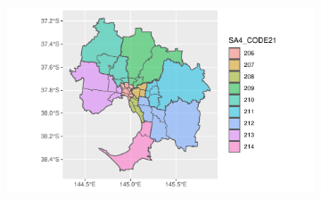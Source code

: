 \documentclass{monashthesis}
\begin{document}
\begin{figure}

\begin{minipage}[t]{0.50\linewidth}

{\centering 


}

\subcaption{\label{fig-ASGS}}
\end{minipage}%
%
\begin{minipage}[t]{0.50\linewidth}

{\centering 

\begin{figure}

{\centering \includegraphics{03-CurrentStudy_files/figure-pdf/fig-GMelbSA2SA3SA4-1.pdf}

}
\end{figure}}
\end{minipage}
\end{figure}
\end{document}
